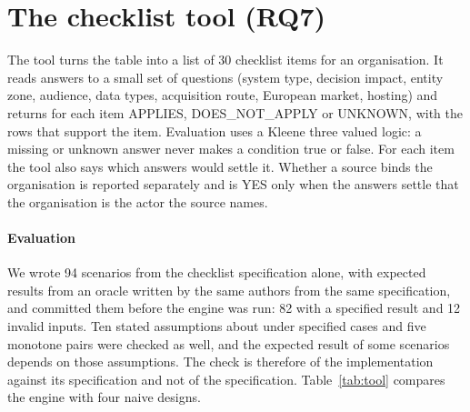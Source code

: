 \documentclass[conference]{IEEEtran}
\begin{document}
\section{The checklist tool (RQ7)}\label{sec:tool}
The tool turns the table into a list of 30 checklist items for an organisation. It reads answers to a small set of questions (system type, decision impact, entity zone, audience, data types, acquisition route, European market, hosting) and returns for each item APPLIES, DOES\_NOT\_APPLY or UNKNOWN, with the rows that support the item. Evaluation uses a Kleene three valued logic: a missing or unknown answer never makes a condition true or false. For each item the tool also says which answers would settle it. Whether a source binds the organisation is reported separately and is YES only when the answers settle that the organisation is the actor the source names.

\paragraph{Evaluation} We wrote 94 scenarios from the checklist specification alone, with expected results from an oracle written by the same authors from the same specification, and committed them before the engine was run: 82 with a specified result and 12 invalid inputs. Ten stated assumptions about under specified cases and five monotone pairs were checked as well, and the expected result of some scenarios depends on those assumptions. The check is therefore of the implementation against its specification and not of the specification. Table~\ref{tab:tool} compares the engine with four naive designs.

\begin{table}[t]\centering\small
{}
\caption{Item level results over 82 specified scenarios (2460 decisions). Wrongly excluded: said not applicable where applicable or unknown was expected. Wrongly applied: said applicable where not applicable or unknown was expected. Unknown: the engine returned unknown.}\label{tab:tool}
\end{table}
\end{document}

